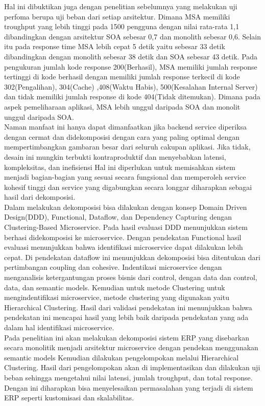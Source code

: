 Hal ini dibuktikan juga dengan penelitian sebelumnya yang melakukan uji perfoma berupa uji beban dari setiap arsitektur. Dimana MSA memiliki troughput yang lebih tinggi pada 1500 pengguna dengan nilai rata-rata 1,1 dibandingkan dengan arsitektur SOA sebesar 0,7 dan monolith sebesar 0,6. Selain itu pada response time MSA lebih cepat 5 detik yaitu sebesar 33 detik dibandingkan dengan monolith sebesar 38 detik dan SOA sebesar 43 detik. Pada pengukuran jumlah kode response 200(Berhasil), MSA memiliki jumlah response tertinggi di kode berhasil dengan memiliki jumlah response terkecil di kode 302(Pengalihan), 304(Cache) ,408(Waktu Habis), 500(Kesalahan Internal Server) dan tidak memiliki jumlah response di kode 404(Tidak ditemukan). Dimana pada aspek pemeliharaan aplikasi, MSA lebih unggul daripada SOA dan monolit unggul daripada SOA.\cite{4}\\

Naman manfaat ini hanya dapat dimanfaatkan jika backend service diperiksa dengan cermat dan didekomposisi dengan cara yang paling optimal dengan mempertimbangkan gambaran besar dari seluruh cakupan aplikasi. Jika tidak, desain ini mungkin terbukti kontraproduktif dan menyebabkan latensi, kompleksitas, dan inefisiensi Hal ini diperlukan untuk memisahkan sistem menjadi bagian-bagian yang sesuai secara fungsional dan memperoleh service kohesif tinggi dan service yang digabungkan secara longgar diharapkan sebagai hasil dari dekomposisi.\cite{3}\\

Dalam melakukan dekomposisi bisa dilakukan dengan konsep Domain Driven Design(DDD), Functional, Dataflow, dan Dependency Capturing dengan Clustering-Based Microservice. Pada hasil evaluasi DDD menunjukkan sistem berhasi didekomposisi ke microservice. Dengan pendekatan Functional hasil evaluasi menunjukkan bahwa identifikasi microservice dapat dilakukan lebih cepat. Di pendekatan dataflow ini menunjukkan dekomposisi bisa ditentukan dari pertimbangan coupling dan cohesive. Indentikasi microservice dengan menganalisis ketergantungan proses bisnis dari control, dengan data dan control, data, dan semantic models. Kemudian untuk metode Clustering untuk mengindentifikasi microservice, metode clustering yang digunakan yaitu Hierarchical Clustering. Hasil dari validasi pendekatan ini menunjukkan bahwa pendekatan ini mencapai hasil yang lebih baik daripada pendekatan yang ada dalam hal identifikasi microservice.\cite{6}\\

Pada penelitian ini akan melakukan dekomposisi sistem ERP yang disebarkan secara monolitik menjadi arsitektur microservice dengan pendekan menggunakan semantic models Kemudian dilakukan pengelompokan melalui Hierarchical Clustering. Hasil dari pengelompokan akan di implementasikan
dan dilakukan uji beban sehingga mengetahui nilai latensi, jumlah troughput, dan total response. Dengan ini diharapkan bisa menyelesaikan permasalahan yang terjadi di sistem ERP seperti kustomisasi dan skalabilitas.\\

